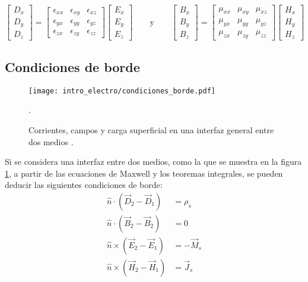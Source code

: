 \begin{equation} \label{eq:diadas}
\begin{bmatrix}
D_x \\
D_y \\
D_z
\end{bmatrix}
=
\begin{bmatrix}
\epsilon_{xx} & \epsilon_{xy} & \epsilon_{xz} \\
\epsilon_{yx} & \epsilon_{yy} & \epsilon_{yz} \\
\epsilon_{zx} & \epsilon_{zy} & \epsilon_{zz}
\end{bmatrix}
\begin{bmatrix}
E_x \\
E_y \\
E_z
\end{bmatrix}
\qquad\text{y}\qquad
\begin{bmatrix}
B_x \\
B_y \\
B_z
\end{bmatrix}
=
\begin{bmatrix}
\mu_{xx} & \mu_{xy} & \mu_{xz} \\
\mu_{yx} & \mu_{yy} & \mu_{yz} \\
\mu_{zx} & \mu_{zy} & \mu_{zz}
\end{bmatrix}
\begin{bmatrix}
H_x \\
H_y \\
H_z
\end{bmatrix}
\end{equation}

\subsection{Condiciones de borde} \label{sec:condiciones-borde}

\begin{figure}[htp]
	\centering
	\texttt{[image: intro\_electro/condiciones\_borde.pdf]}
	\caption{Corrientes, campos y carga superficial en una interfaz general entre dos medios \cite{Pozar:MwEngineering}.}.
	\label{fig:condiciones_borde}
\end{figure}

Si se considera una interfaz entre dos medios, como la que se muestra en la figura \ref{fig:condiciones_borde}, a partir de las ecuaciones de Maxwell y los teoremas integrales, se pueden deducir las siguientes condiciones de borde:
\begin{subequations}
	\label{eq:condiciones_borde}
	\begin{align}
		\hat{n} \cdot (\vec{D}_{2} - \vec{D}_{1}) & = \rho_s \\
		\hat{n} \cdot (\vec{B}_{2} - \vec{B}_{2}) & = 0 \\
		\hat{n} \times (\vec{E}_2 - \vec{E}_1)  & = - \vec{M}_s \\
		\hat{n} \times (\vec{H}_2 - \vec{H}_1) & = \vec{J}_s
	\end{align}
\end{subequations}

